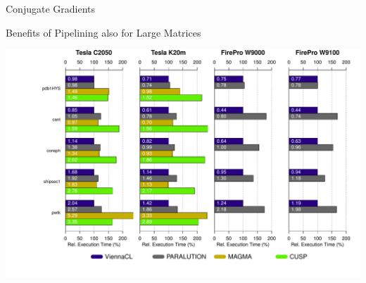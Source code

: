 \begin{frame}[fragile]{Conjugate Gradients}
 \begin{block}{Benefits of Pipelining also for Large Matrices}
 \begin{center}
  \vspace*{-0.2cm}
  \hspace*{-1.5cm}\includegraphics[width=1.05\textwidth]{figures/cg}
 \end{center}
  \vspace*{0.2cm}

 \end{block}   
\end{frame}



